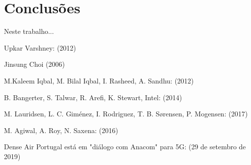 \documentclass{llncs}
\begin{document}
\section{Conclusões}

Neste trabalho...

%

\begin{thebibliography}{1}

Upkar Varshney:
 (2012)

Jinsung Choi
 (2006)

M.Kaleem Iqbal, M. Bilal Iqbal, I. Rasheed, A. Sandhu:
 (2012)

B. Bangerter, S. Talwar, R. Arefi, K. Stewart, Intel:
 (2014)

M. Lauridsen, L. C. Giménez, I. Rodriguez, T. B. Sørensen, P. Mogensen:
 (2017)

M. Agiwal, A. Roy, N. Saxena:
 (2016)

Dense Air Portugal está em "diálogo com Anacom" para 5G:
(29 de setembro de 2019)


\end{thebibliography}
\end{document}

